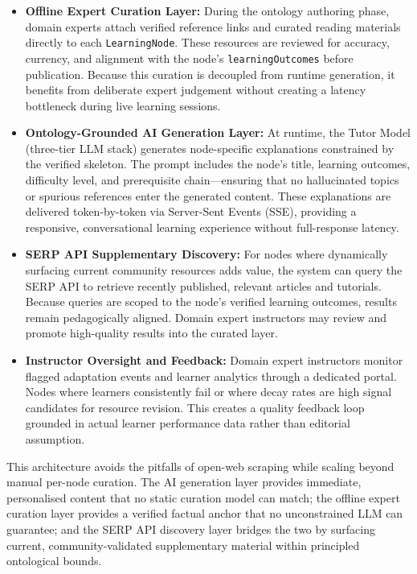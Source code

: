 \begin{itemize}
    \item \textbf{Offline Expert Curation Layer:} During the ontology authoring phase, domain experts attach verified reference links and curated reading materials directly to each \texttt{LearningNode}. These resources are reviewed for accuracy, currency, and alignment with the node's \texttt{learningOutcomes} before publication. Because this curation is decoupled from runtime generation, it benefits from deliberate expert judgement without creating a latency bottleneck during live learning sessions.
    \item \textbf{Ontology-Grounded AI Generation Layer:} At runtime, the Tutor Model (three-tier LLM stack) generates node-specific explanations constrained by the verified skeleton. The prompt includes the node's title, learning outcomes, difficulty level, and prerequisite chain---ensuring that no hallucinated topics or spurious references enter the generated content. These explanations are delivered token-by-token via Server-Sent Events (SSE), providing a responsive, conversational learning experience without full-response latency.
    \item \textbf{SERP API Supplementary Discovery:} For nodes where dynamically surfacing current community resources adds value, the system can query the SERP API to retrieve recently published, relevant articles and tutorials. Because queries are scoped to the node's verified learning outcomes, results remain pedagogically aligned. Domain expert instructors may review and promote high-quality results into the curated layer.
    \item \textbf{Instructor Oversight and Feedback:} Domain expert instructors monitor flagged adaptation events and learner analytics through a dedicated portal. Nodes where learners consistently fail or where decay rates are high signal candidates for resource revision. This creates a quality feedback loop grounded in actual learner performance data rather than editorial assumption.
\end{itemize}

This architecture avoids the pitfalls of open-web scraping while scaling beyond manual per-node curation. The AI generation layer provides immediate, personalised content that no static curation model can match; the offline expert curation layer provides a verified factual anchor that no unconstrained LLM can guarantee; and the SERP API discovery layer bridges the two by surfacing current, community-validated supplementary material within principled ontological bounds.

